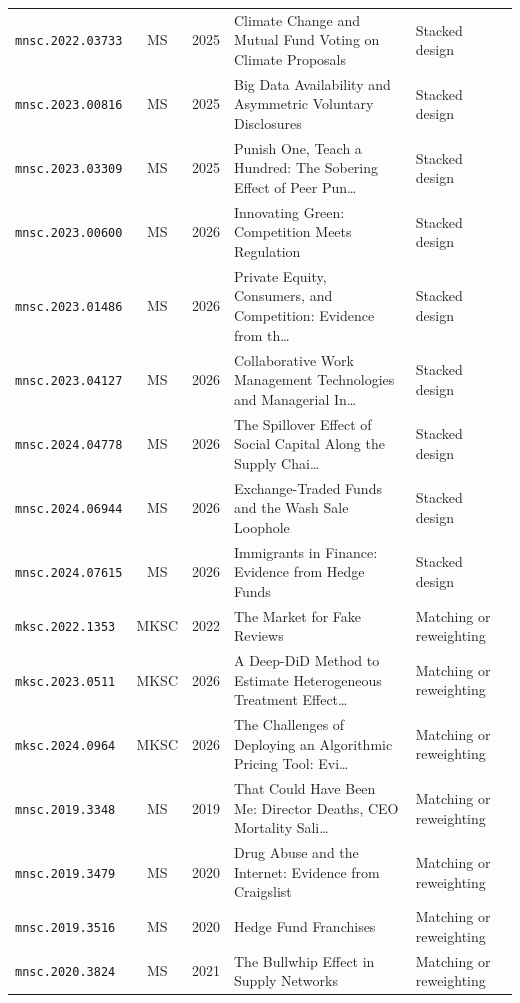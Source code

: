 \begin{longtable}{lccp{}l}
\texttt{mnsc.2022.03733} & MS & 2025 & \raggedright Climate Change and Mutual Fund Voting on Climate Proposals & Stacked design \\
\texttt{mnsc.2023.00816} & MS & 2025 & \raggedright Big Data Availability and Asymmetric Voluntary Disclosures & Stacked design \\
\texttt{mnsc.2023.03309} & MS & 2025 & \raggedright Punish One, Teach a Hundred: The Sobering Effect of Peer Pun\ldots{} & Stacked design \\
\texttt{mnsc.2023.00600} & MS & 2026 & \raggedright Innovating Green: Competition Meets Regulation & Stacked design \\
\texttt{mnsc.2023.01486} & MS & 2026 & \raggedright Private Equity, Consumers, and Competition: Evidence from th\ldots{} & Stacked design \\
\texttt{mnsc.2023.04127} & MS & 2026 & \raggedright Collaborative Work Management Technologies and Managerial In\ldots{} & Stacked design \\
\texttt{mnsc.2024.04778} & MS & 2026 & \raggedright The Spillover Effect of Social Capital Along the Supply Chai\ldots{} & Stacked design \\
\texttt{mnsc.2024.06944} & MS & 2026 & \raggedright Exchange-Traded Funds and the Wash Sale Loophole & Stacked design \\
\texttt{mnsc.2024.07615} & MS & 2026 & \raggedright Immigrants in Finance: Evidence from Hedge Funds & Stacked design \\
\texttt{mksc.2022.1353} & MKSC & 2022 & \raggedright The Market for Fake Reviews & Matching or reweighting \\
\texttt{mksc.2023.0511} & MKSC & 2026 & \raggedright A Deep-DiD Method to Estimate Heterogeneous Treatment Effect\ldots{} & Matching or reweighting \\
\texttt{mksc.2024.0964} & MKSC & 2026 & \raggedright The Challenges of Deploying an Algorithmic Pricing Tool: Evi\ldots{} & Matching or reweighting \\
\texttt{mnsc.2019.3348} & MS & 2019 & \raggedright That Could Have Been Me: Director Deaths, CEO Mortality Sali\ldots{} & Matching or reweighting \\
\texttt{mnsc.2019.3479} & MS & 2020 & \raggedright Drug Abuse and the Internet: Evidence from Craigslist & Matching or reweighting \\
\texttt{mnsc.2019.3516} & MS & 2020 & \raggedright Hedge Fund Franchises & Matching or reweighting \\
\texttt{mnsc.2020.3824} & MS & 2021 & \raggedright The Bullwhip Effect in Supply Networks & Matching or reweighting \\

\end{longtable}

